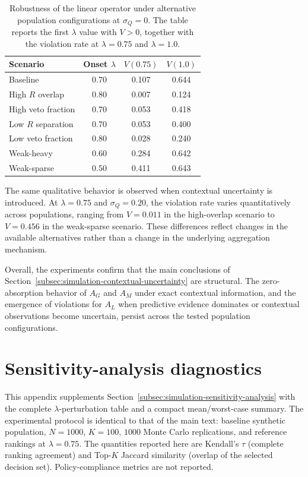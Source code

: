 \documentclass[mathematics,article,submit,moreauthors]{Definitions/mdpi}
\begin{document}
\begin{table}[H]
\caption{Robustness of the linear operator under alternative population
configurations at $\sigma_Q=0$. The table reports the first $\lambda$ value
with $V>0$, together with the violation rate at $\lambda=0.75$ and
$\lambda=1.0$.}
\label{tab:population-robustness-results}
\centering
\small
\renewcommand{\arraystretch}{1.15}
\begin{tabular}{lccc}
\toprule
Scenario & Onset $\lambda$ & $V(0.75)$ & $V(1.0)$\\
\midrule
Baseline & 0.70 & 0.107 & 0.644\\
High $R$ overlap & 0.80 & 0.007 & 0.124\\
High veto fraction & 0.70 & 0.053 & 0.418\\
Low $R$ separation & 0.70 & 0.053 & 0.400\\
Low veto fraction & 0.80 & 0.028 & 0.240\\
Weak-heavy & 0.60 & 0.284 & 0.642\\
Weak-sparse & 0.50 & 0.411 & 0.643\\
\bottomrule
\end{tabular}
\end{table}

The same qualitative behavior is observed when contextual uncertainty is
introduced. At $\lambda=0.75$ and $\sigma_Q=0.20$, the violation rate varies
quantitatively across populations, ranging from $V=0.011$ in the
high-overlap scenario to $V=0.456$ in the weak-sparse scenario. These
differences reflect changes in the available alternatives rather than a
change in the underlying aggregation mechanism.

Overall, the experiments confirm that the main conclusions of
Section~\ref{subsec:simulation-contextual-uncertainty} are structural.
The zero-absorption behavior of $A_G$ and $A_M$ under exact contextual
information, and the emergence of violations for $A_L$ when predictive
evidence dominates or contextual observations become uncertain, persist
across the tested population configurations.

\section[\appendixname~\thesection]{Sensitivity-analysis diagnostics}
\label{app:sensitivity-analysis}

This appendix supplements
Section~\ref{subsec:simulation-sensitivity-analysis} with the complete
$\lambda$-perturbation table and a compact mean/worst-case summary.
The experimental protocol is identical to that of the main text:
baseline synthetic population, $N=1000$, $K=100$, $1000$ Monte Carlo
replications, and reference rankings at $\lambda=0.75$. The quantities
reported here are Kendall's $\tau$ (complete ranking agreement) and
Top-$K$ Jaccard similarity (overlap of the selected decision set).
Policy-compliance metrics are not reported.
\end{document}

